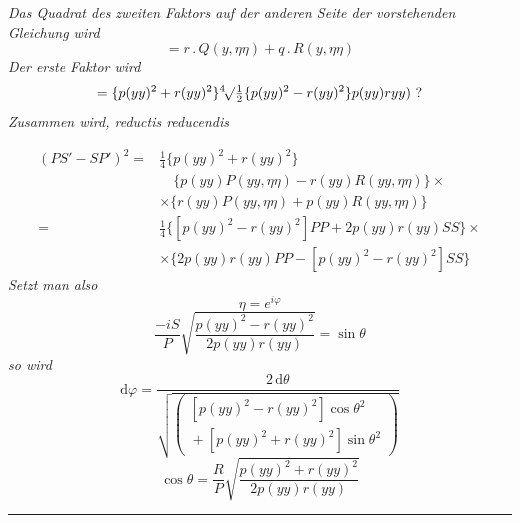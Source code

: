 \textit{Das Quadrat des zweiten Faktors auf der anderen Seite der vorstehenden Gleichung wird}
\[
=r\mathbin{.}Q(y,\eta\eta)+q\mathbin{.}R(y,\eta\eta)
\]
\textit{Der erste Faktor wird}
\[
=\{p(yy)^2+r(yy)^2\}{}^4\!\surd \tfrac12
 \{p(yy)^2-r(yy)^2\}p(yy)ryy)\ ?
\]
\textit{Zusammen wird, reductis reducendis}



\[
\begin{aligned}
(PS'-SP')^2={}&\tfrac14\{p(yy)^2+r(yy)^2\}\\[6pt]&\quad\{p(yy)P(yy,\eta\eta)-r(yy)R(yy,\eta\eta)\}\times\\
&\times\{r(yy)P(yy,\eta\eta)+p(yy)R(yy,\eta\eta)\}\\[10pt]
={}&\tfrac14\{[p(yy)^2-r(yy)^2]PP+2p(yy)r(yy)SS\}\times\\
&\times\{2p(yy)r(yy)PP-[p(yy)^2-r(yy)^2]SS\}
\end{aligned}
\]
\textit{Setzt man also}
\[
\eta=e^{i\varphi}
\]
\[
\dfrac{-iS}{P}\surd {\dfrac{p(yy)^2-r(yy)^2}{2p(yy)r(yy)}}=\sin\theta
\]
\textit{so wird}
\[
\mathrm d\varphi=
\dfrac{2\,\mathrm d\theta}
 {\surd {\left(\begin{gathered}{}[p(yy)^2-r(yy)^2]\cos\theta^2\\[3pt]{}+
[p(yy)^2+r(yy)^2]\sin\theta^2\end{gathered}\right)}}
\]
\[
\cos\theta=\dfrac RP\surd {\dfrac{p(yy)^2+r(yy)^2}{2p(yy)r(yy)}}
\]
\begin{center}\rule{0.23\textwidth}{0.3pt}\end{center}
\clearpage
\endgroup
